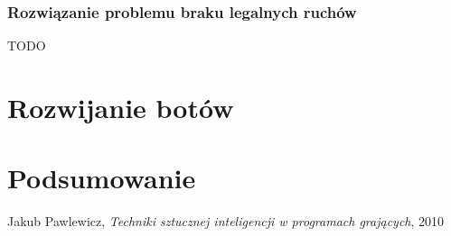\documentclass{pracamgr}
\begin{document}
\subsection*{Rozwiązanie problemu braku legalnych ruchów}

TODO

\chapter{Rozwijanie botów}

\chapter{Podsumowanie}

\begin{thebibliography}{99}

 Jakub Pawlewicz, \textit{Techniki sztucznej inteligencji
    w programach grających}, 2010

\end{thebibliography}
\end{document}
